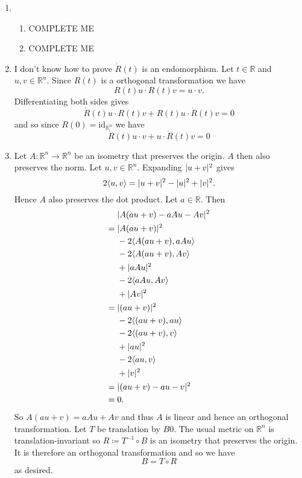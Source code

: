 \documentclass[a4paper, 12pt]{article}
\newcommand{\R}{\mathbb{R}}
\DeclarePairedDelimiter\abs{\lvert}{\rvert}
\begin{document}
\begin{enumerate}
\item \begin{enumerate}

\item {\color{red} COMPLETE ME}

\item {\color{red} COMPLETE ME}

\end{enumerate}

\item {\color{red} I don't know how to prove \(\dot R(t)\) is an endomorphism.} Let \(t\in\R\) and \(u,v\in\R^n\). Since \(R(t)\) is a orthogonal transformation we have
\[R(t)u\cdot R(t)v=u\cdot v.\]
Differentiating both sides gives
\[\dot R(t)u\cdot R(t)v+R(t)u\cdot\dot R(t)v=0\]
and so since \(R(0)=\text{id}_{\R^n}\) we have
\[\dot R(t)u\cdot v+u\cdot\dot R(t)v=0\]

\item Let \(A:\R^n\to\R^n\) be an isometry that preserves the origin. \(A\) then also preserves the norm. Let \(u,v\in\R^n\). Expanding \(\abs{u+v}^2\) gives
\[2\langle u,v\rangle=\abs{u+v}^2-\abs{u}^2+\abs{v}^2.\]
Hence \(A\) also preserves the dot product. Let \(a\in\R\). Then
\begin{align*}
&\abs{A(au+v)-aAu-Av}^2\\
={}&\abs{A(au+v)}^2\\
&-2\langle A(au+v),aAu\rangle\\
&-2\langle A(au+v),Av\rangle\\
&+\abs{aAu}^2\\
&-2\langle aAu,Av\rangle\\
&+\abs{Av}^2\\
={}&\abs{(au+v)}^2\\
&-2\langle (au+v),au\rangle\\
&-2\langle (au+v),v\rangle\\
&+\abs{au}^2\\
&-2\langle au,v\rangle\\
&+\abs{v}^2\\
={}&\abs{(au+v)-au-v}^2\\
={}&0.
\end{align*}
So \(A(au+v)=aAu+Av\) and thus \(A\) is linear and hence an orthogonal transformation. Let \(T\) be translation by \(B0\). The usual metric on \(\R^n\) is translation-invariant so \(R\coloneqq T^{-1}\circ B\) is an isometry that preserves the origin. It is therefore an orthogonal transformation and so we have
\[B=T\circ R\]
as desired.


\end{enumerate}
\end{document}
